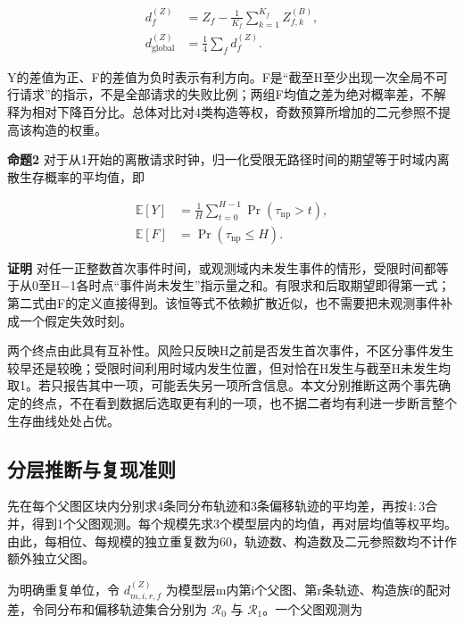 \documentclass[UTF8,a4paper,twocolumn,fontset=none,zihao=5]{ctexart}
\begin{document}
\begin{equation}
\begin{aligned}d_f^{(Z)}&=Z_f-\frac{1}{K_f}\sum_{k=1}^{K_f}Z_{f,k}^{(B)},\\d_{\mathrm{global}}^{(Z)}&=\frac{1}{4}\sum_f d_f^{(Z)}.\end{aligned}
\label{eq:13}\end{equation}


Y的差值为正、F的差值为负时表示有利方向。F是“截至H至少出现一次全局不可行请求”的指示，不是全部请求的失败比例；两组F均值之差为绝对概率差，不解释为相对下降百分比。总体对比对4类构造等权，奇数预算所增加的二元参照不提高该构造的权重。


\noindent\textbf{命题2} 对于从1开始的离散请求时钟，归一化受限无路径时间的期望等于时域内离散生存概率的平均值，即\par


\begin{equation}
\begin{aligned}\mathbb E[Y]&=\frac{1}{H}\sum_{t=0}^{H-1}\Pr(\tau_{\mathrm{np}}>t),\\\mathbb E[F]&=\Pr(\tau_{\mathrm{np}}\leq H).\end{aligned}
\label{eq:14}\end{equation}


\noindent\textbf{证明} 对任一正整数首次事件时间，或观测域内未发生事件的情形，受限时间都等于从0至H$-$1各时点“事件尚未发生”指示量之和。有限求和后取期望即得第一式；第二式由F的定义直接得到。该恒等式不依赖扩散近似，也不需要把未观测事件补成一个假定失效时刻。\par

两个终点由此具有互补性。风险只反映H之前是否发生首次事件，不区分事件发生较早还是较晚；受限时间利用时域内发生位置，但对恰在H发生与截至H未发生均取1。若只报告其中一项，可能丢失另一项所含信息。本文分别推断这两个事先确定的终点，不在看到数据后选取更有利的一项，也不据二者均有利进一步断言整个生存曲线处处占优。


\subsection{分层推断与复现准则}

先在每个父图区块内分别求4条同分布轨迹和3条偏移轨迹的平均差，再按4$:$3合并，得到1个父图观测。每个规模先求3个模型层内的均值，再对层均值等权平均。由此，每相位、每规模的独立重复数为60，轨迹数、构造数及二元参照数均不计作额外独立父图。


为明确重复单位，令 $d_{m,i,r,f}^{(Z)}$ 为模型层m内第i个父图、第r条轨迹、构造族f的配对差，令同分布和偏移轨迹集合分别为 $\mathcal R_0$ 与 $\mathcal R_1$。一个父图观测为
\end{document}
